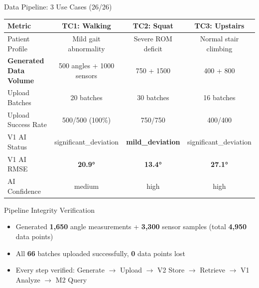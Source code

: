 \documentclass[aspectratio=169,utf8,11pt]{beamer}
\begin{document}
\begin{frame}{Data Pipeline: 3 Use Cases (26/26)}
  \begin{table}[h]
    \centering
    \footnotesize
    \begin{tabular}{lccc}
      \toprule
      \textbf{Metric} & \textbf{TC1: Walking} & \textbf{TC2: Squat} & \textbf{TC3: Upstairs} \\
      \midrule
      Patient Profile & Mild gait abnormality & Severe ROM deficit & Normal stair climbing \\
      \textbf{Generated Data Volume} & 500 angles + 1000 sensors & 750 + 1500 & 400 + 800 \\
      Upload Batches & 20 batches & 30 batches & 16 batches \\
      Upload Success Rate & \cellcolor{green!15}500/500 (100\%) & \cellcolor{green!15}750/750 & \cellcolor{green!15}400/400 \\
      \midrule
      V1 AI Status & significant\_deviation & \textbf{mild\_deviation} & significant\_deviation \\
      V1 AI RMSE & \textbf{20.9°} & \textbf{13.4°} & \textbf{27.1°} \\
      AI Confidence & medium & high & high \\
      \bottomrule
    \end{tabular}
  \end{table}

  \begin{block}{Pipeline Integrity Verification}
    \begin{itemize}
      \item Generated \textbf{1,650} angle measurements + \textbf{3,300} sensor samples (total \textbf{4,950} data points)
      \item All \textbf{66} batches uploaded successfully, \textbf{0} data points lost
      \item Every step verified: Generate $\rightarrow$ Upload $\rightarrow$ V2 Store $\rightarrow$ Retrieve $\rightarrow$ V1 Analyze $\rightarrow$ M2 Query
    \end{itemize}
  \end{block}
\end{frame}
\end{document}

